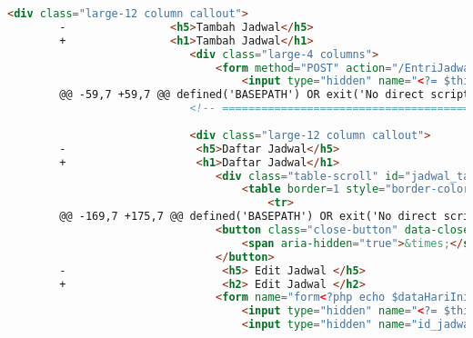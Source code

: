 \begin{itemize}
\begin{lstlisting}[frame=single, label={lst:perbaikan_1.3.1_tag_heading}, language=HTML, caption=Perbaikan Kriteria Sukses 1.3.1 - Penggunaan \textit{Heading} Tidak Tepat]
                        <div class="large-12 column callout">
        -                <h5>Tambah Jadwal</h5>
        +                <h1>Tambah Jadwal</h1>
                            <div class="large-4 columns">
                                <form method="POST" action="/EntriJadwalDosen/add">
                                    <input type="hidden" name="<?= $this->security->get_csrf_token_name() ?>" value="<?= $this->security->get_csrf_hash() ?>" />
        @@ -59,7 +59,7 @@ defined('BASEPATH') OR exit('No direct script access allowed');
                            <!-- ===================================================================== Pembentukan Tabel ============================================================================= -->
            
                            <div class="large-12 column callout">
        -                    <h5>Daftar Jadwal</h5>
        +                    <h1>Daftar Jadwal</h1>
                                <div class="table-scroll" id="jadwal_table">
                                    <table border=1 style="border-color:black ; border-collapse:separate">
                                        <tr>
        @@ -169,7 +175,7 @@ defined('BASEPATH') OR exit('No direct script access allowed');
                                <button class="close-button" data-close aria-label="Close modal" type="button">
                                    <span aria-hidden="true">&times;</span>
                                </button>
        -                        <h5> Edit Jadwal </h5>
        +                        <h2> Edit Jadwal </h2>
                                <form name="form<?php echo $dataHariIni->id ?>" method="POST" action="/EntriJadwalDosen/update/<?php echo $dataHariIni->id ?>">
                                    <input type="hidden" name="<?= $this->security->get_csrf_token_name() ?>" value="<?= $this->security->get_csrf_hash() ?>" />
                                    <input type="hidden" name="id_jadwal_parameter" value="<?php echo $dataHariIni->id ?>"> </a> <br>
    \end{lstlisting}


\end{itemize}
